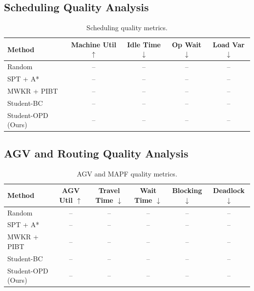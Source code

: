 \documentclass[11pt,a4paper]{article}
\begin{document}
\subsection{Scheduling Quality Analysis}

\begin{table}[htbp]
    \centering
    \caption{Scheduling quality metrics.}
    \label{tab:scheduling}
    \begin{tabular}{lcccc}
        \toprule
        \textbf{Method} & \textbf{Machine Util} $\uparrow$ & \textbf{Idle Time} $\downarrow$ & \textbf{Op Wait} $\downarrow$ & \textbf{Load Var} $\downarrow$ \\
        \midrule
        Random           & -- & -- & -- & -- \\
        SPT + A*         & -- & -- & -- & -- \\
        MWKR + PIBT      & -- & -- & -- & -- \\
        Student-BC       & -- & -- & -- & -- \\
        Student-OPD (Ours) & -- & -- & -- & -- \\
        \bottomrule
    \end{tabular}
\end{table}

\subsection{AGV and Routing Quality Analysis}

\begin{table}[htbp]
    \centering
    \caption{AGV and MAPF quality metrics.}
    \label{tab:routing}
    \begin{tabular}{lccccc}
        \toprule
        \textbf{Method} & \textbf{AGV Util} $\uparrow$ & \textbf{Travel Time} $\downarrow$ & \textbf{Wait Time} $\downarrow$ & \textbf{Blocking} $\downarrow$ & \textbf{Deadlock} $\downarrow$ \\
        \midrule
        Random           & -- & -- & -- & -- & -- \\
        SPT + A*         & -- & -- & -- & -- & -- \\
        MWKR + PIBT      & -- & -- & -- & -- & -- \\
        Student-BC       & -- & -- & -- & -- & -- \\
        Student-OPD (Ours) & -- & -- & -- & -- & -- \\
        \bottomrule
    \end{tabular}
\end{table}
\end{document}
